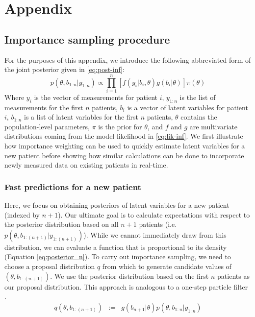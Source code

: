 \documentclass[12pt, letterpaper]{article}
\begin{document}



\section{Appendix}
\subsection{Importance sampling procedure}
For the purposes of this appendix, we introduce the following abbreviated form of the joint posterior given in \ref{eq:post-inf}: 
\begin{equation}
p(\theta,b_{1:n}|y_{1:n})\propto\prod_{i=1}^{n}[f(y_{i}|b_{i},\theta)g(b_{i}|\theta)]\pi(\theta)\label{eq:posterior_n}
\end{equation}
 Where $y_{i}$ is the vector of measurements for patient $i$, $y_{1:n}$ is the list of measurements for the first $n$ patients, $b_{i}$ is a vector of latent variables for patient $i$, $b_{1:n}$ is a list of latent variables for the first $n$ patients, $\theta$ contains the population-level parameters, $\pi$ is the prior for $\theta$, and $f$ and $g$ are multivariate distributions coming from the model likelihood in \ref{eq:lik-inf}. We first illustrate how importance weighting can be used to quickly estimate latent variables for a new patient before showing how similar calculations can be done to incorporate newly measured data on existing patients in real-time.
 
\subsubsection{Fast predictions for a new patient}
 Here, we focus on obtaining posteriors of latent variables for a new patient (indexed by $n+1$). Our ultimate goal is to calculate expectations with respect to the posterior distribution based on all $n+1$ patients (i.e. $p(\theta,b_{1:(n+1)}|y_{1:(n+1)})$). While we cannot immediately draw from this distribution, we can evaluate a function that is proportional to its density (Equation \ref{eq:posterior_n}). To carry out importance sampling, we need to choose a proposal distribution $q$ from which to generate candidate values of $(\theta,b_{1:(n+1)})$. We use the posterior distribution based on the first $n$ patients as our proposal distribution. This approach is analogous to a one-step particle filter \cite{Bishop2006}.
\begin{eqnarray*}
q(\theta,b_{1:(n+1)}) & := & g(b_{n+1}|\theta)p(\theta,b_{1:n}|y_{1:n})
\end{eqnarray*}
\end{document}
